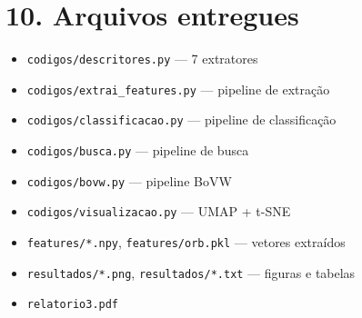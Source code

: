 \documentclass[12pt, a4paper]{article}
\begin{document}
\section*{10. Arquivos entregues}
\begin{itemize}
    \item \texttt{codigos/descritores.py} --- 7 extratores
    \item \texttt{codigos/extrai\_features.py} --- pipeline de extração
    \item \texttt{codigos/classificacao.py} --- pipeline de classificação
    \item \texttt{codigos/busca.py} --- pipeline de busca
    \item \texttt{codigos/bovw.py} --- pipeline BoVW
    \item \texttt{codigos/visualizacao.py} --- UMAP + t-SNE
    \item \texttt{features/*.npy}, \texttt{features/orb.pkl} --- vetores extraídos
    \item \texttt{resultados/*.png}, \texttt{resultados/*.txt} --- figuras e tabelas
    \item \texttt{relatorio3.pdf}
\end{itemize}
\end{document}
